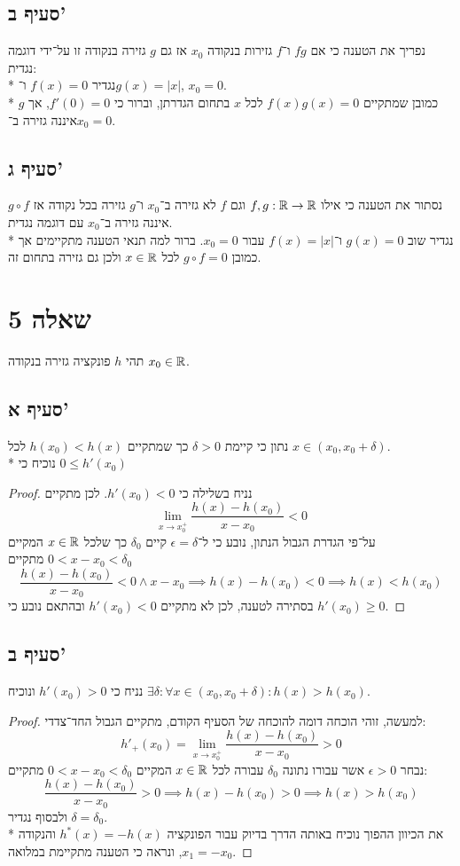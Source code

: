 \subsection{סעיף ב'}
נפריך את הטענה כי אם $fg$ ו־$f$ גזירות בנקודה $x_0$ אז גם $g$ גזירה בנקודה זו על־ידי דוגמה נגדית: \\*
נגדיר $f(x) = 0$ ו־$g(x) = |x|$, $x_0 = 0$. \\*
כמובן שמתקיים $f(x) g(x) = 0$ לכל $x$ בתחום הגדרתן, וברור כי $f'(0) = 0$, אך $g$ איננה גזירה ב־$x_0 = 0$.

\subsection{סעיף ג'}
נסתור את הטענה כי אילו $f, g : \mathbb{R} \rightarrow \mathbb{R}$ וגם $f$ לא גזירה ב־$x_0$ ו־$g$ גזירה בכל נקודה אז $g \circ f$ איננה גזירה ב־$x_0$ עם דוגמה נגדית. \\*
נגדיר שוב $g(x) = 0$ ו־$f(x) = |x|$ עבור $x_0 = 0$. ברור למה תנאי הטענה מתקיימים אך כמובן $g \circ f = 0$ לכל $x \in \mathbb{R}$ ולכן גם גזירה בתחום זה.

\section{שאלה 5}
תהי $h$ פונקציה גזירה בנקודה $x_0 \in \mathbb{R}$.
\subsection{סעיף א'}
נתון כי קיימת $\delta > 0$ כך שמתקיים $h(x_0) < h(x)$ לכל $x \in (x_0, x_0 + \delta)$. \\*
נוכיח כי $0 \le h'(x_0)$
\begin{proof}
	נניח בשלילה כי $h'(x_0) < 0$. לכן מתקיים
	\[
		\lim_{x \to x_0^+} \frac{h(x) - h(x_0)}{x - x_0} < 0
	\]
	על־פי הגדרת הגבול הנתון, נובע כי ל־$\epsilon = \delta$ קיים $\delta_0$ כך שלכל $x \in \mathbb{R}$ המקיים $0 < x - x_0 < \delta_0$ מתקיים
	\[
		\frac{h(x) - h(x_0)}{x - x_0} < 0 \land x - x_0 \implies h(x) - h(x_0) < 0 \implies h(x) < h(x_0)
	\]
	בסתירה לטענה, לכן לא מתקיים $h'(x_0) < 0$ ובהתאם נובע כי $h'(x_0) \ge 0$.
\end{proof}

\subsection{סעיף ב'}
נניח כי $h'(x_0) > 0$ ונוכיח $\exists \delta : \forall x \in (x_0, x_0 + \delta) : h(x) > h(x_0)$.
\begin{proof}
	למעשה, זוהי הוכחה דומה להוכחה של הסעיף הקודם, מתקיים הגבול החד־צדדי:
	\[
		h'_+(x_0) = \lim_{x \to x_0^+} \frac{h(x) - h(x_0)}{x - x_0} > 0
	\]
	נבחר $\epsilon > 0$ אשר עבורו נתונה $\delta_0$ עבורה לכל $x \in \mathbb{R}$ המקיים $0 < x - x_0 < \delta_0$ מתקיים:
	\[
		\frac{h(x) - h(x_0)}{x - x_0} > 0 \implies h(x) - h(x_0) > 0 \implies h(x) > h(x_0)
	\]
	ולבסוף נגדיר $\delta = \delta_0$. \\*
	את הכיוון ההפוך נוכיח באותה הדרך בדיוק עבור הפונקציה $h^*(x) = -h(x)$ והנקודה $x_1 = -x_0$, ונראה כי הטענה מתקיימת במלואה.
\end{proof}

